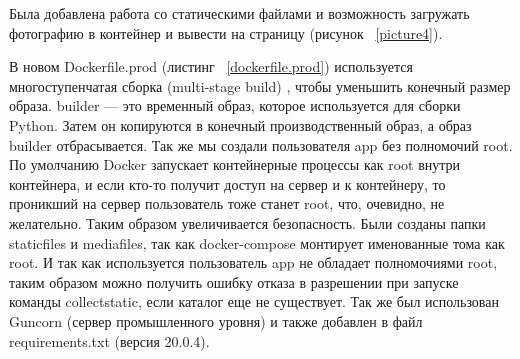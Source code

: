Была добавлена работа со статическими файлами и возможность загружать фотографию в контейнер и вывести на страницу (рисунок ~\ref{picture4}).

В новом \textsf{Dockerfile.prod} (листинг ~\ref{dockerfile.prod}) используется многоступенчатая сборка (\textsf{multi-stage build}) , чтобы уменьшить конечный размер образа. \textsf{builder} — это временный образ, которое используется для сборки \textsf{Python}. Затем он копируются в конечный производственный образ, а образ \textsf{builder} отбрасывается. Так же мы создали пользователя app без полномочий \textsf{root}. По умолчанию \textsf{Docker} запускает контейнерные процессы как \textsf{root} внутри контейнера, и если кто-то получит доступ на сервер и к контейнеру, то проникший на сервер пользователь тоже станет \textsf{root}, что, очевидно, не желательно. Таким образом увеличивается безопасность. Были созданы папки \textsf{staticfiles} и \textsf{mediafiles}, так как \textsf{docker-compose} монтирует именованные тома как \textsf{root}. И так как используется пользователь \textsf{app} не обладает полномочиями \textsf{root}, таким образом можно получить ошибку отказа в разрешении при запуске команды \textsf{collectstatic}, если каталог еще не существует.
	Так же был использован \textsf{Guncorn} (сервер промышленного уровня) и также добавлен в файл \textsf{requirements.txt} (версия \textsf{20.0.4}).

